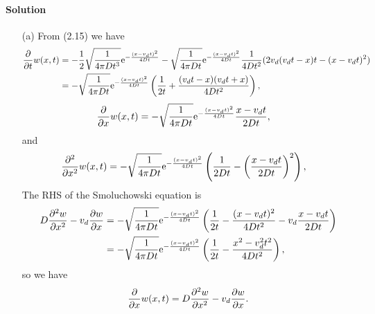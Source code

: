 \documentclass[hyperref, a4paper]{article}
\newcommand*{\ee}{\mathrm{e}}
\begin{document}
\paragraph{Solution} \begin{itemize}
\item[(a)] From (2.15) we have 
\[
    \begin{aligned}
        \pdv{t} w(x, t) &= 
        - \frac{1}{2} \sqrt{\frac{1}{4 \pi D t^3}} \ee^{- \frac{(x - v_d t)^2}{4 D t}} 
        - \sqrt{\frac{1}{4 \pi D t}} \ee^{- \frac{(x - v_d t)^2}{4 D t}} \frac{1}{4 D t^2} 
        (2 v_d (v_d t - x) t - (x- v_d t)^2 ) \\
        &= - \sqrt{\frac{1}{4 \pi D t}} \ee^{- \frac{(x - v_d t)^2}{4 D t}} 
        \left( \frac{1}{2 t} + \frac{(v_d t - x) (v_d t + x)}{4 D t^2} \right),
    \end{aligned}
\]
\[
    \begin{aligned}
        \pdv{x}w(x, t) &= - \sqrt{\frac{1}{4 \pi D t}} \ee^{- \frac{(x - v_d t)^2}{4 D t}} 
        \frac{x - v_d t}{2 D t},
    \end{aligned}
\]
and 
\[
    \begin{aligned}
        \pdv[2]{x}w(x, t) &= - \sqrt{\frac{1}{4 \pi D t}} \ee^{- \frac{(x - v_d t)^2}{4 D t}} 
        \left(
            \frac{1}{2 D t} - \left( \frac{x - v_d t}{2 D t} \right)^2
        \right),
    \end{aligned}
\]
The RHS of the Smoluchowski equation is 
\[
    \begin{aligned}
        D \pdv[2]{w}{x} - v_d \pdv{w}{x} &= - \sqrt{\frac{1}{4 \pi D t}} \ee^{- \frac{(x - v_d t)^2}{4 D t}} 
        \left(
            \frac{1}{2 t} - \frac{(x - v_d t)^2}{4 D t^2} - v_d \frac{x - v_d t}{2 D t}
        \right) \\
        &= - \sqrt{\frac{1}{4 \pi D t}} \ee^{- \frac{(x - v_d t)^2}{4 D t}} 
        \left(
            \frac{1}{2 t} - \frac{x^2 - v_d^2 t^2}{4 D t^2}
        \right),
    \end{aligned}
\]
so we have 
\[
    \pdv{x}w(x, t) = D \pdv[2]{w}{x} - v_d \pdv{w}{x} .
\]


\end{itemize}
\end{document}
